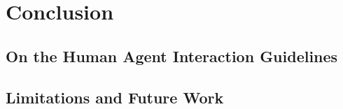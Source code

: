 \documentclass[a4paper,11pt,twoside]{StyleThese}
\begin{document}
\fi


\chapter*{Conclusion}



\section*{On the Human Agent Interaction Guidelines}


\section*{Limitations and Future Work}



\ifdefined{}
\else


\end{document}
